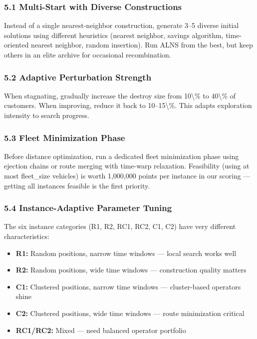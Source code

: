 \documentclass[twocolumn,10pt,letterpaper]{article}
\begin{document}
\subsubsection{5.1 Multi-Start with Diverse Constructions}

Instead of a single nearest-neighbor construction, generate 3--5 diverse initial solutions using different heuristics (nearest neighbor, savings algorithm, time-oriented nearest neighbor, random insertion). Run ALNS from the best, but keep others in an elite archive for occasional recombination.


\subsubsection{5.2 Adaptive Perturbation Strength}

When stagnating, gradually increase the destroy size from 10\textbackslash{}\% to 40\textbackslash{}\% of customers. When improving, reduce it back to 10--15\textbackslash{}\%. This adapts exploration intensity to search progress.


\subsubsection{5.3 Fleet Minimization Phase}

Before distance optimization, run a dedicated fleet minimization phase using ejection chains or route merging with time-warp relaxation. Feasibility (using at most fleet\_size vehicles) is worth 1,000,000 points per instance in our scoring --- getting all instances feasible is the first priority.


\subsubsection{5.4 Instance-Adaptive Parameter Tuning}

The six instance categories (R1, R2, RC1, RC2, C1, C2) have very different characteristics:

\begin{itemize}
\setlength{\itemsep}{0pt}
\setlength{\parskip}{0pt}
  \item \textbf{R1:} Random positions, narrow time windows --- local search works well
  \item \textbf{R2:} Random positions, wide time windows --- construction quality matters
  \item \textbf{C1:} Clustered positions, narrow time windows --- cluster-based operators shine
  \item \textbf{C2:} Clustered positions, wide time windows --- route minimization critical
  \item \textbf{RC1/RC2:} Mixed --- need balanced operator portfolio
\end{itemize}
\end{document}
